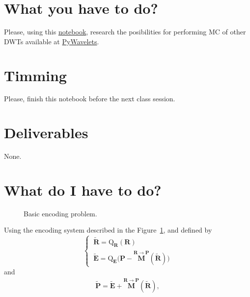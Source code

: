 \section{What you have to do?}
  
Please, using this
\href{https://github.com/Sistemas-Multimedia/Sistemas-Multimedia.github.io/blob/master/study_guide/10-MC_in_DWT_domain/DWT_shift_variance.ipynb}{notebook},
research the posibilities for performing MC of other DWTs available at
\href{https://pywavelets.readthedocs.io/en/latest/}{PyWavelets}.

\section{Timming}

Please, finish this notebook before the next class session.

\section{Deliverables}

None.

\section{What do I have to do?}

\begin{figure}
  \centering
  \caption{Basic encoding problem.}
  \label{fig:problem}
\end{figure}

Using the encoding system described in the Figure~\ref{fig:problem}, and defined by
\begin{equation}
  \left\{\
    \begin{array}{l}
      \tilde{\mathbf R} = \text{Q}_{\mathbf R}({\mathbf R}) \\
      \tilde{\mathbf E} = \text{Q}_{\mathbf E}\big({\mathbf P}-\overset{{\mathbf R}\rightarrow {\mathbf P}}{\mathbf M}(\tilde{\mathbf R})\big)
    \end{array}
  \right.
  \label{eq:forward}
\end{equation}
and
\begin{equation}
  \begin{array}{l}
    \tilde{\mathbf P} = \tilde{\mathbf E} + \overset{{\mathbf R}\rightarrow {\mathbf P}}{\mathbf M}(\tilde{\mathbf R}),
  \end{array}
  \label{eq:backward}
\end{equation}

